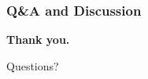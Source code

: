 \documentclass{beamer}
\begin{document}
\begin{frame}
    \frametitle{Q\&A and Discussion}
    \vfill
    \begin{center}
        \Huge \textbf{Thank you.}
        \vspace{1em}
        
        \Large Questions?
    \end{center}
    \vfill
\end{frame}
\end{document}

